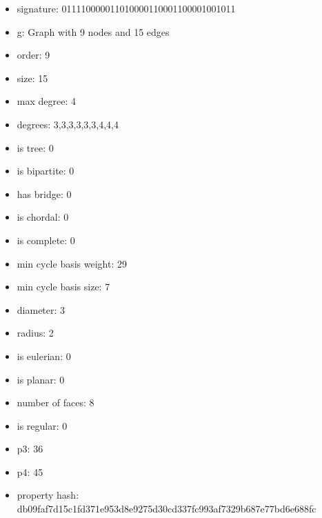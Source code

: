 \begin{figure}
\end{figure}
\begin{itemize}
\item signature: 011110000011010000110001100001001011
\item g: Graph with 9 nodes and 15 edges
\item order: 9
\item size: 15
\item max degree: 4
\item degrees: 3,3,3,3,3,3,4,4,4
\item is tree: 0
\item is bipartite: 0
\item has bridge: 0
\item is chordal: 0
\item is complete: 0
\item min cycle basis weight: 29
\item min cycle basis size: 7
\item diameter: 3
\item radius: 2
\item is eulerian: 0
\item is planar: 0
\item number of faces: 8
\item is regular: 0
\item p3: 36
\item p4: 45
\item property hash: db09faf7d15c1fd371e953d8e9275d30cd337fc993af7329b687e77bd6e688fc
\end{itemize}
\newpage
